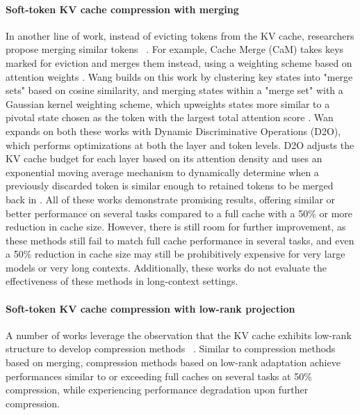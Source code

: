 \paragraph{Soft-token KV cache compression with merging} In another line of work, instead of evicting tokens from the KV cache, researchers propose merging similar tokens ~\cite{wang2024model,zhang2024cam,wan2024d2o, liu2024minicache}. For example, Cache Merge (CaM) takes keys marked for eviction and merges them instead, using a weighting scheme based on attention weights \cite{zhang2024cam}. Wang \etal builds on this work by clustering key states into "merge sets" based on cosine similarity, and merging states within a "merge set" with a Gaussian kernel weighting scheme, which upweights states more similar to a pivotal state chosen as the token with the largest total attention score \cite{wang2024model}. Wan \etal expands on both these works with Dynamic Discriminative Operations (D2O), which performs optimizations at both the layer and token levels. D2O adjusts the KV cache budget for each layer based on its attention density and uses an exponential moving average mechanism to dynamically determine when a previously discarded token is similar enough to retained tokens to be merged back in \cite{wan2024d2o}. All of these works demonstrate promising results, offering similar or better performance on several tasks compared to a full cache with a 50\% or more reduction in cache size. However, there is still room for further improvement, as these methods still fail to match full cache performance in several tasks, and even a 50\% reduction in cache size may still be prohibitively expensive for very large models or very long contexts. Additionally, these works do not evaluate the effectiveness of these methods in long-context settings.
\paragraph{Soft-token KV cache compression with low-rank projection} A number of works leverage the observation that the KV cache exhibits low-rank structure to develop compression methods ~\cite{yu2024effectively,chang2024palu, zhang2024lorc, zhou2025elitekv, saxena2024eigenattn}. Similar to compression methods based on merging, compression methods based on low-rank adaptation achieve performances similar to or exceeding full caches on several tasks at 50\% compression, while experiencing performance degradation upon further compression.
